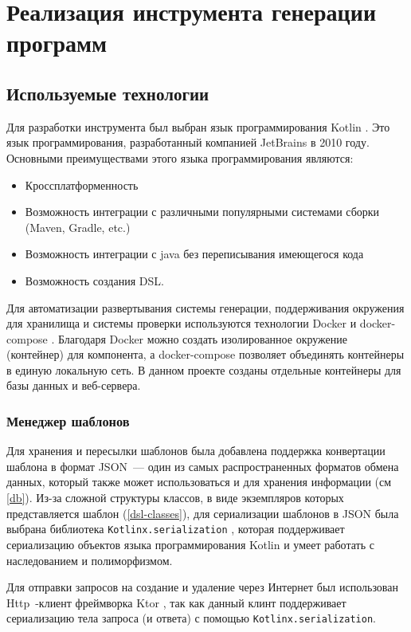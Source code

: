 \section{Реализация инструмента генерации программ}

\subsection{Используемые технологии}

Для разработки инструмента был выбран язык программирования Kotlin \cite{kotlin}. Это язык
программирования, разработанный компанией JetBrains в 2010 году. Основными
преимуществами этого языка программирования являются:
\begin{itemize}
    \item Кроссплатформенность
    \item Возможность интеграции с различными популярными системами сборки
          (Maven, Gradle, etc.)
    \item Возможность интеграции с java без переписывания имеющегося кода
    \item Возможность создания DSL.
\end{itemize}

Для автоматизации развертывания системы генерации, поддерживания окружения для хранилища и
системы проверки используются технологии Docker \cite{docker} и docker-compose \cite{docker-compose}.
Благодаря Docker можно создать изолированное окружение (контейнер) для компонента, а docker-compose
позволяет объединять контейнеры в единую локальную сеть. В данном проекте созданы отдельные
контейнеры для базы данных и веб-сервера.


\subsubsection{Менеджер шаблонов}
Для хранения и пересылки шаблонов была добавлена поддержка конвертации шаблона в формат JSON~---
один из самых распространенных форматов обмена данных, который также может использоваться и для
хранения информации (см \ref{db}). Из-за сложной структуры классов,
в виде экземпляров которых представляется шаблон (\ref{dsl-classes}), для сериализации шаблонов в
JSON была выбрана библиотека \texttt{Kotlinx.serialization} \cite{kotlinx-serialization},
которая поддерживает сериализацию объектов языка программирования Kotlin и умеет работать
с наследованием и полиморфизмом.

Для отправки запросов на создание и удаление через Интернет был использован
Http~-клиент фреймворка Ktor \cite{ktor}, так как данный клинт поддерживает
сериализацию тела запроса (и ответа) с помощью \texttt{Kotlinx.serialization}.

